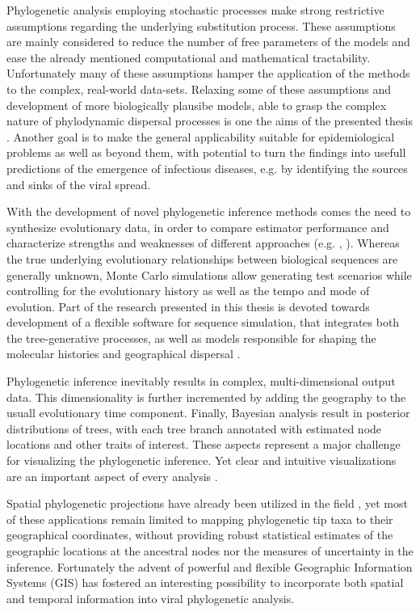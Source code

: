 Phylogenetic analysis employing stochastic processes make strong restrictive assumptions regarding the underlying substitution process.
These assumptions are mainly considered to reduce the number of free parameters of the models and ease the already mentioned computational and mathematical tractability.
Unfortunately many of these assumptions hamper the application of the methods to the complex, real-world data-sets.
Relaxing some of these assumptions and development of more biologically plausibe models, able to grasp the complex nature of phylodynamic dispersal processes is one the aims of the presented thesis \citep{Bielejec2014a}.
Another goal is to make the general applicability suitable for epidemiological problems as well as beyond them, with potential to turn the findings into usefull predictions of the emergence of infectious diseases, e.g. by identifying the sources and sinks of the viral spread.

With the development of novel phylogenetic inference methods comes the need to synthesize evolutionary data, in order to compare estimator performance and characterize strengths and weaknesses of different approaches (e.g. \cite{Arenas2012}, \cite{Hoban2011}).
Whereas the true underlying evolutionary relationships between biological sequences are generally unknown, Monte Carlo simulations allow generating test scenarios while controlling for the evolutionary history as well as the tempo and mode of evolution. 
Part of the research presented in this thesis is devoted towards development of a flexible software for sequence simulation, that integrates both the tree-generative processes, as well as models responsible for shaping the molecular histories and geographical dispersal \citep{Bielejec2014a}.

Phylogenetic inference inevitably results in complex, multi-dimensional output data.
This dimensionality is further incremented by adding the geography to the usuall evolutionary time component.
Finally, Bayesian analysis result in posterior distributions of trees, with each tree branch annotated with estimated node locations and other traits of interest.
These aspects represent a major challenge for visualizing the phylogenetic inference.
Yet clear and intuitive visualizations are an important aspect of every analysis \citep{Hadley2010}.

Spatial phylogenetic projections have already been utilized in the field \citep{Kidd2006,Parks2009}, yet most of these applications remain limited to mapping phylogenetic tip taxa to their geographical coordinates, without providing robust statistical estimates of the geographic locations at the ancestral nodes nor the measures of uncertainty in the inference.
Fortunately the advent of powerful and flexible Geographic Information Systems (GIS) has fostered an interesting possibility to incorporate both spatial and temporal information into viral phylogenetic analysis.

